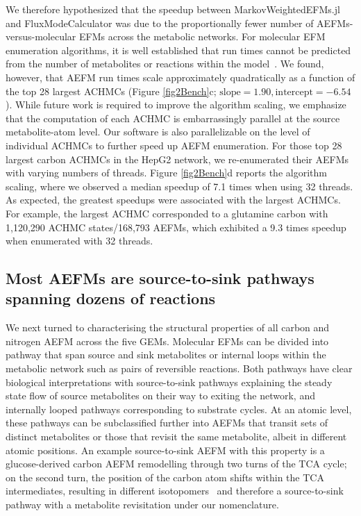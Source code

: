 \documentclass[12pt]{article}
\begin{document}
We therefore hypothesized that the speedup between MarkovWeightedEFMs.jl
and FluxModeCalculator was due to the proportionally fewer number of
AEFMs-versus-molecular EFMs across the metabolic networks. For molecular
EFM enumeration algorithms, it is well established that run times cannot
be predicted from the number of metabolites or reactions within the
model~\citep{UllahEhsan2020Tsef}. We found, however, that AEFM run times
scale approximately quadratically as a function of the top 28 largest
ACHMCs (Figure \ref{fig2Bench}c; $\text{slope}=1.90, \text{intercept}=-6.54$). While
future work is required to improve the algorithm scaling, we emphasize
that the computation of each ACHMC is embarrassingly parallel at the
source metabolite-atom level. Our software is also parallelizable on the
level of individual ACHMCs to further speed up AEFM enumeration. For those
top 28 largest carbon ACHMCs in the HepG2 network, we re-enumerated their
AEFMs with varying numbers of threads. Figure \ref{fig2Bench}d reports the algorithm
scaling, where we observed a median speedup of 7.1 times when using 32
threads. As expected, the greatest speedups were associated with the
largest ACHMCs. For example, the largest ACHMC corresponded to a glutamine
carbon with 1,120,290 ACHMC states/168,793 AEFMs, which exhibited a 9.3
times speedup when enumerated with 32 threads.

\fi

\subsection*{Most AEFMs are source-to-sink pathways spanning dozens of reactions}

We next turned to characterising the structural properties of all carbon
and nitrogen AEFM across the five GEMs. Molecular EFMs can be divided into
pathway that span source and sink metabolites or internal loops within the
metabolic network such as pairs of reversible reactions. Both pathways
have clear biological interpretations with source-to-sink pathways
explaining the steady state flow of source metabolites on their way to
exiting the network, and internally looped pathways corresponding to
substrate cycles. At an atomic level, these pathways can be subclassified
further into AEFMs that transit sets of distinct metabolites or those that
revisit the same metabolite, albeit in different atomic positions. 
An example source-to-sink AEFM with this property is a glucose-derived
carbon AEFM remodelling through two turns of the TCA cycle; on the second
turn, the position of the carbon atom shifts within the TCA intermediates,
resulting in different isotopomers~\citep{DuanLikun20221tas} and therefore
a source-to-sink pathway with a metabolite revisitation under our
nomenclature.
\end{document}
